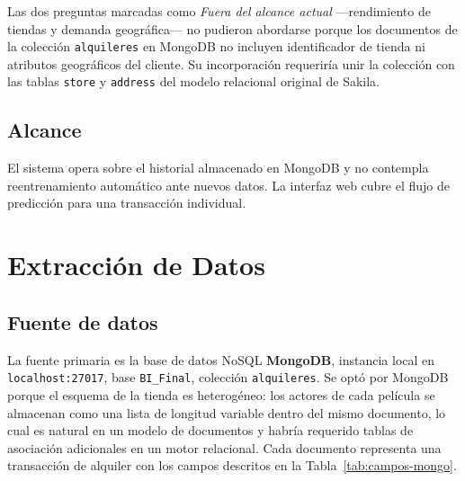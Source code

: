 \documentclass[12pt, a4paper]{report}
\begin{document}
Las dos preguntas marcadas como \textit{Fuera del alcance actual} ---rendimiento de tiendas y demanda geográfica--- no pudieron abordarse porque los documentos de la colección \texttt{alquileres} en MongoDB no incluyen identificador de tienda ni atributos geográficos del cliente. Su incorporación requeriría unir la colección con las tablas \texttt{store} y \texttt{address} del modelo relacional original de Sakila.

\section{Alcance}

El sistema opera sobre el historial almacenado en MongoDB y no contempla reentrenamiento automático ante nuevos datos. La interfaz web cubre el flujo de predicción para una transacción individual.

\chapter{Extracción de Datos}
\label{cap:datos}

\section{Fuente de datos}

La fuente primaria es la base de datos NoSQL \textbf{MongoDB}, instancia local en \texttt{localhost:27017}, base \texttt{BI\_Final}, colección \texttt{alquileres}. Se optó por MongoDB porque el esquema de la tienda es heterogéneo: los actores de cada película se almacenan como una lista de longitud variable dentro del mismo documento, lo cual es natural en un modelo de documentos y habría requerido tablas de asociación adicionales en un motor relacional. Cada documento representa una transacción de alquiler con los campos descritos en la Tabla~\ref{tab:campos-mongo}.
\end{document}
